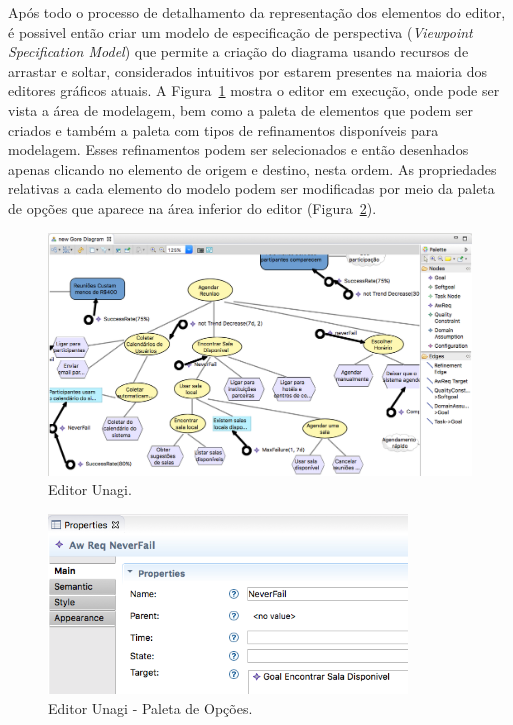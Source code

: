 Após todo o processo de detalhamento da representação dos elementos do editor, é possivel então criar um modelo de especificação de perspectiva (\textit{Viewpoint Specification Model}) que permite a criação do diagrama usando recursos de arrastar e soltar, considerados intuitivos por estarem presentes na maioria dos editores gráficos atuais. A Figura~\ref{figura-paleta-unagi} mostra o editor em execução, onde pode ser vista a área de modelagem, bem como a paleta de elementos que podem ser criados e também a paleta com tipos de refinamentos disponíveis para modelagem. Esses refinamentos podem ser selecionados e então desenhados apenas clicando no elemento de origem e destino, nesta ordem. As propriedades relativas a cada elemento do modelo podem ser modificadas por meio da paleta de opções que aparece na área inferior do editor (Figura~\ref{unagi-paleta-opcoes}).

\begin{figure}
	\centering
	\includegraphics[width=1\textwidth]{figuras/unagi/modeloemunagi.png}
	\caption{Editor Unagi.}
	\label{figura-paleta-unagi}
\end{figure}

\begin{figure}
	\centering
	\includegraphics[width=0.85\textwidth]{figuras/unagi/paletaopcoes.png}
	\caption{Editor Unagi - Paleta de Opções.}
	\label{unagi-paleta-opcoes}
\end{figure}

